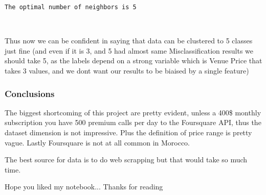 \documentclass[11pt]{article}
\begin{document}
    \begin{Verbatim}[commandchars=\\\{\}]
The optimal number of neighbors is 5

    \end{Verbatim}

    \begin{center}
    \end{center}
    { \hspace*{\fill} \\}
    
    Thus now we can be confident in saying that data can be clustered to 5
classes just fine (and even if it is 3, and 5 had almost same
Misclassification results we should take 5, as the labels depend on a
strong variable which is Venue Price that takes 3 values, and we dont
want our results to be biaised by a single feature)

    \subsubsection{Conclusions}\label{conclusions}

The biggest shortcoming of this project are pretty evident, unless a
400\$ monthly subscription you have 500 premium calls per day to the
Foursquare API, thus the dataset dimension is not impressive. Plus the
definition of price range is pretty vague. Lastly Foursquare is not at
all common in Morocco.

The best source for data is to do web scrapping but that would take so
much time.

Hope you liked my notebook... Thanks for reading


    
    
    
    
\end{document}
